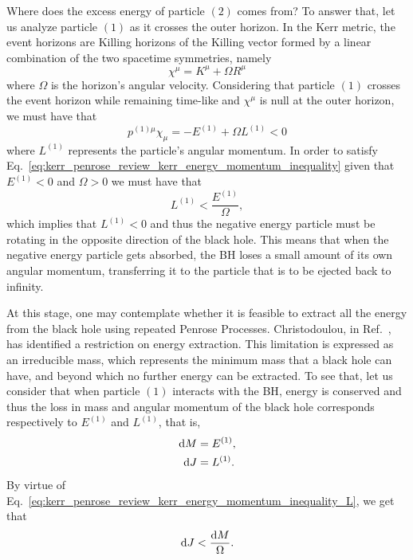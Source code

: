 Where does the excess energy of particle $(2)$ comes from? To answer that, let us analyze particle $(1)$ as it crosses the outer horizon. In the Kerr metric, the event horizons are Killing horizons of the Killing vector formed by a linear combination of the two spacetime symmetries, namely
%
\begin{equation}
  \chi^\mu = K^\mu + \Omega R^\mu
  \label{eq:kerr_penrose_review_kerr_killing_horizon}
\end{equation}
%
where $\Omega$ is the horizon's angular velocity. Considering that particle $(1)$ crosses the event horizon while remaining time-like and $\chi^\mu$ is null at the outer horizon, we must have that
%
\begin{equation}
  p^{(1)\mu}\chi_\mu = -E^{(1)} + \Omega L^{(1)} < 0
  \label{eq:kerr_penrose_review_kerr_energy_momentum_inequality}
\end{equation}
%
where $L^{(1)}$ represents the particle's angular momentum. In order to satisfy Eq.~\eqref{eq:kerr_penrose_review_kerr_energy_momentum_inequality} given that $E^{(1)} < 0$ and $\Omega > 0$ we must have that
%
\begin{equation}
  L^{(1)} < \frac{E^{(1)}}{\Omega},
  \label{eq:kerr_penrose_review_kerr_energy_momentum_inequality_L}
\end{equation}
%
which implies that $L^{(1)} < 0$ and thus the negative energy particle must be rotating in the opposite direction of the black hole. This means that when the negative energy particle gets absorbed, the \ac{BH} loses a small amount of its own angular momentum, transferring it to the particle that is to be ejected back to infinity.

At this stage, one may contemplate whether it is feasible to extract all the energy from the black hole using repeated Penrose Processes. Christodoulou, in Ref.~\cite{CHRISTODOULOU1970}, has identified a restriction on energy extraction. This limitation is expressed as an irreducible mass, which represents the minimum mass that a black hole can have, and beyond which no further energy can be extracted. To see that, let us consider that when particle $(1)$ interacts with the \ac{BH}, energy is conserved and thus the loss in mass and angular momentum of the black hole corresponds respectively to $E^{(1)}$ and $L^{(1)}$, that is,
%
\begin{align}
  \mathrm{d} M & = E^{(1)} \label{eq:kerr_penrose_review_kerr_mass_change}, \\
  \mathrm{d} J & = L^{(1)} \label{eq:kerr_penrose_review_kerr_L_change}.
\end{align}
%
By virtue of Eq.~\eqref{eq:kerr_penrose_review_kerr_energy_momentum_inequality_L}, we get that
%
\begin{equation}
  \mathrm{d} J < \frac{\mathrm{d} M}{\Omega}.
  \label{eq:kerr_penrose_review_kerr_energy_momentum_inequality_L_diff}
\end{equation}


